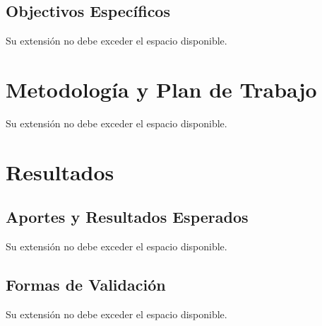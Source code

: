 \documentclass[12pt,spanish]{article}
\begin{document}
\begin{boxedminipage}{\textwidth}
\hspace{20mm}
\vspace{70 mm} %
\end{boxedminipage}

\subsection{Objectivos Específicos}
Su extensión no debe exceder el espacio disponible.

\begin{boxedminipage}{\textwidth}
\hspace{20mm}
\vspace{70 mm} %
\end{boxedminipage}

\newpage
\section[]{Metodología y Plan de Trabajo}
Su extensión no debe exceder el espacio disponible.

\begin{boxedminipage}{\textwidth}
\hspace{20mm}
\vspace{70 mm} %
\end{boxedminipage}


\newpage
\section[]{Resultados}
\subsection{Aportes y Resultados Esperados}
Su extensión no debe exceder el espacio disponible.

\begin{boxedminipage}{\textwidth}
\hspace{20mm}
\vspace{70 mm} %
\end{boxedminipage}

\subsection{Formas de Validación}
Su extensión no debe exceder el espacio disponible.

\begin{boxedminipage}{\textwidth}
\hspace{20mm}
\vspace{70 mm} %
\end{boxedminipage}
\end{document}
